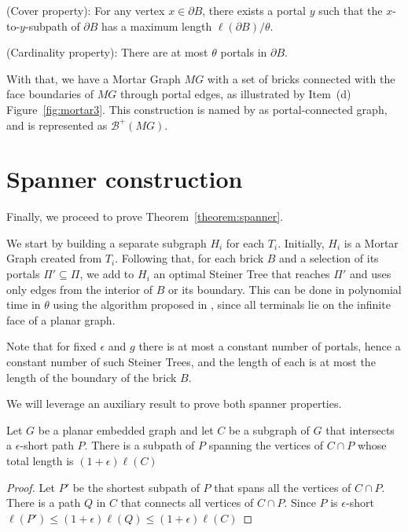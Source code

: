 \begin{lemma} \label{lemma:cobertura}
(Cover property): For any vertex \(x \in \partial B\), there exists a portal \(y\) such that the \(x\)-to-\(y\)-subpath of \(\partial B\) has a maximum length \(\ell(\partial B) / \theta\).
\end{lemma}

\begin{lemma}
(Cardinality property): There are at most \(\theta\) portals in \(\partial B\).
\end{lemma}

With that, we have a Mortar Graph \(MG\) with a set of bricks connected with the face boundaries of \(MG\) through portal edges, as illustrated by Item~(d) Figure~\ref{fig:mortar3}. This construction is named by \citeauthor{Borradaile2009b} as portal-connected graph, and is represented as \(\mathcal{B}^{+}(MG)\).

\section{Spanner construction}

Finally, we proceed to prove Theorem~\ref{theorem:spanner}.

We start by building a separate subgraph \(H_i\) for each \(T_i\). Initially, \(H_i\) is a Mortar Graph created from \(T_i\). Following that, for each brick \(B\) and a selection of its portals \(\Pi' \subseteq \Pi\), we add to \(H_i\) an optimal Steiner Tree that reaches \(\Pi'\) and uses only edges from the interior of \(B\) or its boundary. This can be done in polynomial time in \(\theta\) using the algorithm proposed in \cite{ericksonST}, since all terminals lie on the infinite face of a planar graph.

Note that for fixed \(\epsilon\) and \(g\) there is at most a constant number of portals, hence a constant number of such Steiner Trees, and the length of each is at most the length of the boundary of the brick \(B\).

We will leverage an auxiliary result to prove both spanner properties.

\begin{lemma}\label{lemma:borradaile_10_1}
    Let \(G\) be a planar embedded graph and let \(C\) be a subgraph of \(G\) that intersects a \(\epsilon\)-short path \(P\). There is a subpath of \(P\) spanning the vertices of \(C \cap P\) whose total length is \((1 + \epsilon) \ell(C)\)
\end{lemma}
\begin{proof}
    Let \(P'\) be the shortest subpath of \(P\) that spans all the vertices of \(C \cap P\). There is a path \(Q\) in \(C\) that connects all vertices of \(C \cap P\). Since \(P\) is \(\epsilon\)-short \(\ell(P') \leq (1 + \epsilon)\ell(Q) \leq (1 + \epsilon)\ell(C)\)
\end{proof}

